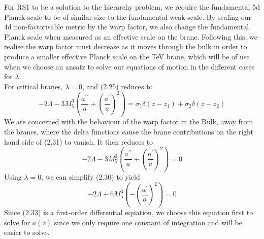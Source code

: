 \documentclass[11pt]{report}
\numberwithin{equation}{chapter}
\begin{document}
For RS1 to be a solution to the hierarchy problem, we require the fundamental 5d Planck scale to be of similar size to the fundamental weak scale. By scaling our 4d non-factorisable metric by the warp factor, we also change the fundamental Planck scale when measured as an effective scale on the brane. Following this, we realise the warp factor must decrease as it moves through the bulk in order to produce a smaller effective Planck scale on the TeV brane, which will be of use when we choose an ansatz to solve our equations of motion in the different cases for $\lambda$.
\\
For critical branes, $\lambda = 0$, and (2.25) reduces to 
 \begin{equation}
    -2\Lambda-3M^3_5\left(\frac{a^{\prime\prime}}{a}+\left(\frac{a^\prime}{a}\right)^2\right)=\sigma_1\delta\left(z-z_1\right)+\sigma_2\delta\left(z-z_2\right)
\end{equation}
We are concerned with the behaviour of the warp factor in the Bulk, away from the branes, where the delta functions cause the brane contributions on the right hand side of (2.31) to vanish. It then reduces to
\begin{equation}
    -2\Lambda-3M^3_5\left(\frac{a^{\prime\prime}}{a}+\left(\frac{a^\prime}{a}\right)^2\right)=0
\end{equation}
Using $\lambda = 0$, we can simplify (2.30) to yield
\begin{equation}
    -2\Lambda+6M^3_5\left(-\left(\frac{a^\prime}{a}\right)^2\right)=0
\end{equation}
Since (2.33) is a first-order differential equation, we choose this equation first to solve for $a(z)$ since we only require one constant of integration and will be easier to solve. 
\end{document}
